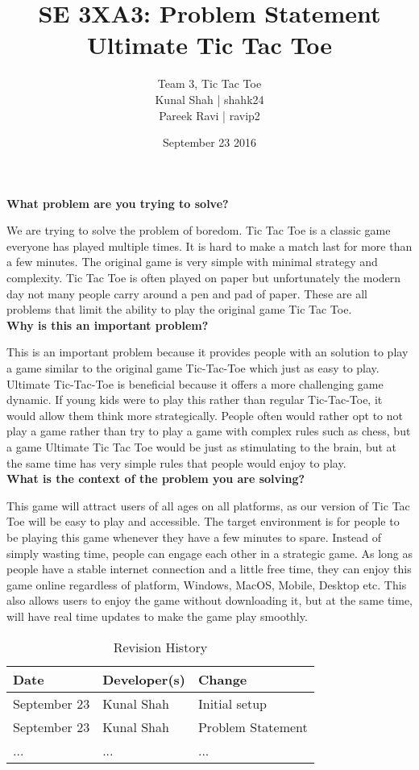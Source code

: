 \documentclass{article}
\title{SE 3XA3: Problem Statement\\Ultimate Tic Tac Toe }
\author{Team 3, Tic Tac Toe
		\\ Kunal Shah | shahk24
		\\ Pareek Ravi | ravip2
}
\date{September 23 2016}
\begin{document}
\maketitle

\noindent \textbf{What problem are you trying to solve?}

We are trying to solve the problem of boredom. Tic Tac Toe is a classic game everyone has played multiple times. It is hard to make a match last for more than a few minutes. The original game is very simple with minimal strategy and complexity. Tic Tac Toe is often played on paper but unfortunately the modern day not many people carry around a pen and pad of paper. These are all problems that limit the ability to play the original game Tic Tac Toe.\\

\noindent \textbf {Why is this an important problem?}

This is an important problem because it provides people with an solution to play a game similar to the original game Tic-Tac-Toe which just as easy to play. Ultimate Tic-Tac-Toe is beneficial because it offers a more challenging game dynamic. If young kids were to play this rather than regular Tic-Tac-Toe, it would allow them think more strategically. People often would rather opt to not play a game rather than try to play a game with complex rules such as chess, but a game Ultimate Tic Tac Toe would be just as stimulating to the brain, but at the same time has very simple rules that people would enjoy to play.\\

\noindent \textbf {What is the context of the problem you are solving?}

This game will attract users of all ages on all platforms, as our version of Tic Tac Toe will be easy to play and accessible. The target environment is for people to be playing this game whenever they have a few minutes to spare. Instead of simply wasting time, people can engage each other in a strategic game. As long as people have a stable internet connection and a little free time, they can enjoy this game online regardless of platform, Windows, MacOS, Mobile, Desktop etc. This also allows users to enjoy the game without downloading it, but at the same time, will have real time updates to make the game play smoothly.\\

\newpage

\begin{table}[hp]
\caption{Revision History} \label{TblRevisionHistory}
\begin{tabularx}{\textwidth}{llX}
\toprule
\textbf{Date} & \textbf{Developer(s)} & \textbf{Change}\\
\midrule
September 23 & Kunal Shah & Initial setup\\
September 23 & Kunal Shah & Problem Statement \\
... & ... & ...\\
\bottomrule
\end{tabularx}
\end{table}
\end{document}
